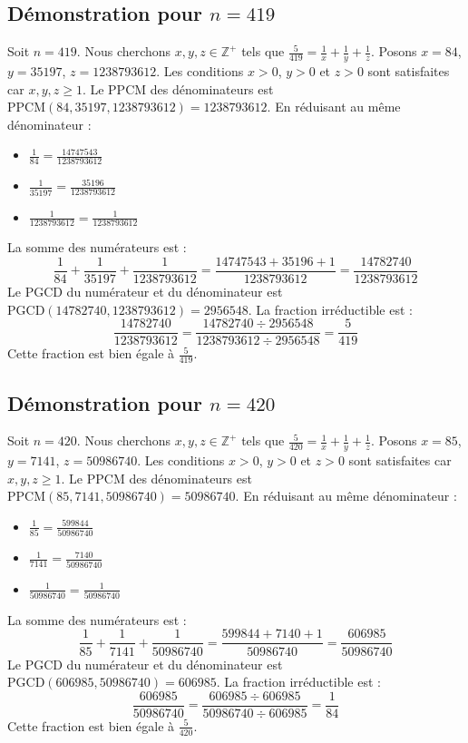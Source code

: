 \documentclass[11pt,a4paper]{article}
\begin{document}
\subsection{Démonstration pour $n = 419$}
Soit $n = 419$. Nous cherchons $x, y, z \in \mathbb{Z}^{+}$ tels que $\frac{5}{419} = \frac{1}{x} + \frac{1}{y} + \frac{1}{z}$.
Posons $x = 84$, $y = 35197$, $z = 1238793612$.
Les conditions $x > 0$, $y > 0$ et $z > 0$ sont satisfaites car $x, y, z \geq 1$.
Le PPCM des dénominateurs est $\text{PPCM}(84, 35197, 1238793612) = 1238793612$.
En réduisant au même dénominateur :
\begin{itemize}
    \item $\frac{1}{84} = \frac{14747543}{1238793612}$
    \item $\frac{1}{35197} = \frac{35196}{1238793612}$
    \item $\frac{1}{1238793612} = \frac{1}{1238793612}$
\end{itemize}
La somme des numérateurs est :
$$ \frac{1}{84} + \frac{1}{35197} + \frac{1}{1238793612} = \frac{14747543 + 35196 + 1}{1238793612} = \frac{14782740}{1238793612} $$
Le PGCD du numérateur et du dénominateur est $\text{PGCD}(14782740, 1238793612) = 2956548$.
La fraction irréductible est :
$$ \frac{14782740}{1238793612} = \frac{14782740 \div 2956548}{1238793612 \div 2956548} = \frac{5}{419} $$
Cette fraction est bien égale à $\frac{5}{419}$.

\subsection{Démonstration pour $n = 420$}
Soit $n = 420$. Nous cherchons $x, y, z \in \mathbb{Z}^{+}$ tels que $\frac{5}{420} = \frac{1}{x} + \frac{1}{y} + \frac{1}{z}$.
Posons $x = 85$, $y = 7141$, $z = 50986740$.
Les conditions $x > 0$, $y > 0$ et $z > 0$ sont satisfaites car $x, y, z \geq 1$.
Le PPCM des dénominateurs est $\text{PPCM}(85, 7141, 50986740) = 50986740$.
En réduisant au même dénominateur :
\begin{itemize}
    \item $\frac{1}{85} = \frac{599844}{50986740}$
    \item $\frac{1}{7141} = \frac{7140}{50986740}$
    \item $\frac{1}{50986740} = \frac{1}{50986740}$
\end{itemize}
La somme des numérateurs est :
$$ \frac{1}{85} + \frac{1}{7141} + \frac{1}{50986740} = \frac{599844 + 7140 + 1}{50986740} = \frac{606985}{50986740} $$
Le PGCD du numérateur et du dénominateur est $\text{PGCD}(606985, 50986740) = 606985$.
La fraction irréductible est :
$$ \frac{606985}{50986740} = \frac{606985 \div 606985}{50986740 \div 606985} = \frac{1}{84} $$
Cette fraction est bien égale à $\frac{5}{420}$.
\end{document}
